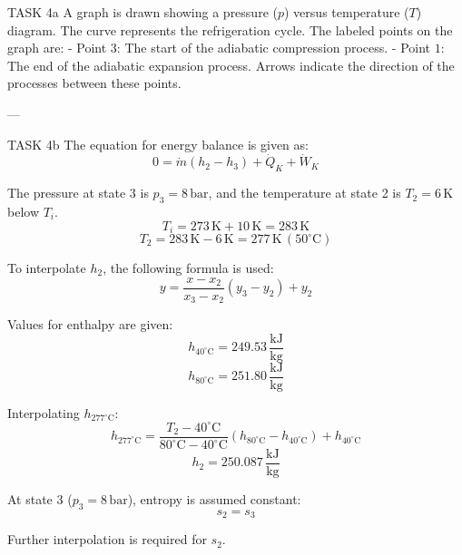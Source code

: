 TASK 4a  
A graph is drawn showing a pressure (\(p\)) versus temperature (\(T\)) diagram. The curve represents the refrigeration cycle. The labeled points on the graph are:  
- Point \(3\): The start of the adiabatic compression process.  
- Point \(1\): The end of the adiabatic expansion process.  
Arrows indicate the direction of the processes between these points.

---

TASK 4b  
The equation for energy balance is given as:  
\[
0 = \dot{m} (h_2 - h_3) + \dot{Q}_K + \dot{W}_K
\]

The pressure at state 3 is \(p_3 = 8 \, \text{bar}\), and the temperature at state 2 is \(T_2 = 6 \, \text{K}\) below \(T_i\).  
\[
T_i = 273 \, \text{K} + 10 \, \text{K} = 283 \, \text{K}
\]
\[
T_2 = 283 \, \text{K} - 6 \, \text{K} = 277 \, \text{K} \, (50^\circ\text{C})
\]

To interpolate \(h_2\), the following formula is used:  
\[
y = \frac{x - x_2}{x_3 - x_2} (y_3 - y_2) + y_2
\]

Values for enthalpy are given:  
\[
h_{40^\circ\text{C}} = 249.53 \, \frac{\text{kJ}}{\text{kg}}
\]
\[
h_{80^\circ\text{C}} = 251.80 \, \frac{\text{kJ}}{\text{kg}}
\]

Interpolating \(h_{277^\circ\text{C}}\):  
\[
h_{277^\circ\text{C}} = \frac{T_2 - 40^\circ\text{C}}{80^\circ\text{C} - 40^\circ\text{C}} (h_{80^\circ\text{C}} - h_{40^\circ\text{C}}) + h_{40^\circ\text{C}}
\]
\[
h_2 = 250.087 \, \frac{\text{kJ}}{\text{kg}}
\]

At state 3 (\(p_3 = 8 \, \text{bar}\)), entropy is assumed constant:  
\[
s_2 = s_3
\]

Further interpolation is required for \(s_2\).
